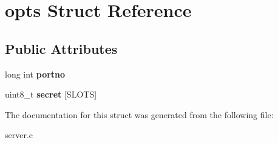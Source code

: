 \hypertarget{structopts}{}\section{opts Struct Reference}
\label{structopts}
\subsection*{Public Attributes}
\begin{DoxyCompactItemize}
\item 
\hypertarget{structopts_ab4aa22e47e3b1f9e067745f0a77a91e5}{}\label{structopts_ab4aa22e47e3b1f9e067745f0a77a91e5} 
long int {\bfseries portno}
\item 
\hypertarget{structopts_a93c875acf3e4fd9cbfc092cfe4054ea9}{}\label{structopts_a93c875acf3e4fd9cbfc092cfe4054ea9} 
uint8\+\_\+t {\bfseries secret} \mbox{[}S\+L\+O\+TS\mbox{]}
\end{DoxyCompactItemize}


The documentation for this struct was generated from the following file\+:\begin{DoxyCompactItemize}
\item 
server.\+c\end{DoxyCompactItemize}
